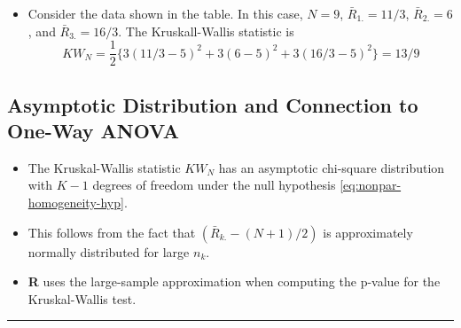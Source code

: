 \documentclass[]{book}
\providecommand{\tightlist}{%
  \setlength{\itemsep}{0pt}\setlength{\parskip}{0pt}}
\begin{document}
\begin{itemize}
\tightlist
\item
  Consider the data shown in the table. In this case, \(N = 9\), \(\bar{R}_{1.} = 11/3\), \(\bar{R}_{2.} = 6\), and \(\bar{R}_{3.} = 16/3\). The Kruskall-Wallis
  statistic is
  \begin{equation}
  KW_{N} = \frac{1}{2}\Big\{ 3(11/3 - 5)^{2} + 3(6 - 5)^{2} + 3(16/3 - 5)^{2}   \Big\} = 13/9  \nonumber
  \end{equation}
\end{itemize}

\hypertarget{asymptotic-distribution-and-connection-to-one-way-anova}{%
\subsection{Asymptotic Distribution and Connection to One-Way ANOVA}\label{asymptotic-distribution-and-connection-to-one-way-anova}}

\begin{itemize}
\item
  The Kruskal-Wallis statistic \(KW_{N}\) has
  an asymptotic chi-square distribution with \(K-1\) degrees of freedom under the null hypothesis \eqref{eq:nonpar-homogeneity-hyp}.
\item
  This follows from the fact that \((\bar{R}_{k.} - (N+1)/2)\) is approximately normally distributed
  for large \(n_{k}\).
\item
  \textbf{R} uses the large-sample approximation when computing
  the p-value for the Kruskal-Wallis test.
\end{itemize}

\begin{center}\rule{0.5\linewidth}{\linethickness}\end{center}
\end{document}
